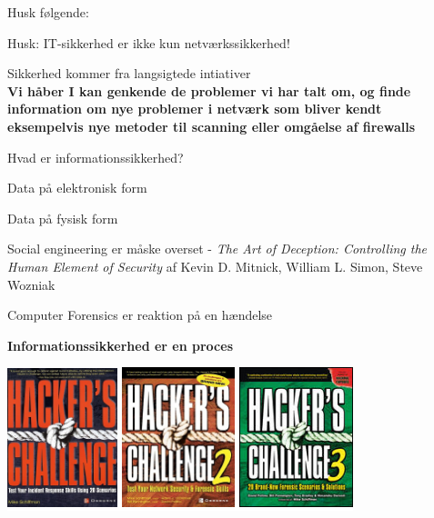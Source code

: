 \documentclass[20pt,landscape,a4paper,footrule]{foils}
\begin{document}

\begin{list1}
\item Husk følgende:
\begin{list2}
\item Husk: IT-sikkerhed er ikke kun netværkssikkerhed!
\item Sikkerhed kommer fra langsigtede intiativer\\
 {\bfseries Vi håber I kan genkende de problemer vi har talt om,
    og finde information om nye problemer i netværk som bliver kendt\\
 eksempelvis nye metoder til scanning eller omgåelse af
    firewalls}
\item Hvad er informationssikkerhed?
\item Data på elektronisk form
\item Data på fysisk form
\item Social engineering er måske overset - \emph{The Art of Deception:
Controlling the Human Element of Security}
af Kevin D. Mitnick, William L. Simon, Steve Wozniak
\end{list2}
\item Computer Forensics er reaktion på en hændelse
\item {\bfseries Informationssikkerhed er en proces}
\end{list1}




\myquestionspage



\begin{center}
\colorbox{white}{
\includegraphics[width=32mm]{images/hackers-challenge.jpg}
\includegraphics[width=33mm]{images/hackers-challenge2.jpg}
\includegraphics[width=33mm]{images/hackers-challenge-3.jpg}}
\end{center}
\end{document}
